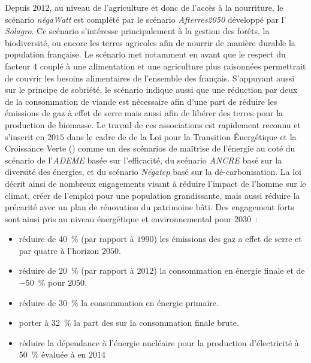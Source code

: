 Depuis $2012$, au niveau de l’agriculture et donc de l’accès à la nourriture, le scénario \textit{négaWatt}
est complété par le scénario \textit{Afterres2050} développé par l’ \textit{Solagro}. Ce
scénario s’intéresse principalement à la gestion des forêts, la biodiversité, ou encore
les terres agricoles afin de nourrir de manière durable la population française.
Le scénario met notamment en avant que le respect du facteur $4$ couplé à une alimentation
et une agriculture plus raisonnées permettrait de couvrir les besoins alimentaires
de l’ensemble des français. S’appuyant aussi sur le principe de sobriété, le scénario
indique aussi que une réduction par deux de la consommation de viande est
nécessaire afin d’une part de réduire les émissions de gaz à effet de serre mais
aussi afin de libérer des terres pour la production de biomasse.
Le travail de ces associations est rapidement reconnu et s’inscrit en $2015$ dans le cadre de
de la Loi pour la Transition Énergétique et la Croissance Verte
()
comme un des scénarios de maîtrise de l’énergie au coté du scénario de l’\textit{ADEME}
basée sur l’efficacité, du scénario \textit{ANCRE} basé sur la diversité des énergies, et du scénario \textit{Négatep}
basé sur la dé-carbonisation.
La loi décrit ainsi de nombreux engagements visant à réduire l’impact de l’homme sur le
climat, créer de l’emploi pour une population grandissante, mais aussi réduire la précarité
avec un plan de rénovation du patrimoine bâti. Des engagement forts sont ainsi pris au
niveau énergétique et environnemental pour $2030$~:
\begin{itemize}
    \item réduire de \SI{40}{\percent} (par rapport à $1990$) les émissions des gaz a
          effet de serre et par quatre à l’horizon $2050$.
    \item réduire de \SI{20}{\percent} (par rapport à $2012$) la consommation en énergie
          finale et de \SI{-50}{\percent} pour $2050$.
    \item réduire de \SI{30}{\percent} la consommation en énergie primaire.
    \item porter à \SI{32}{\percent} la part des  sur la consommation finale brute.
    \item réduire la dépendance à l’énergie nucléaire pour la production d’électricité à
          \SI{50}{\percent} évaluée à  en $2014$
\end{itemize}

